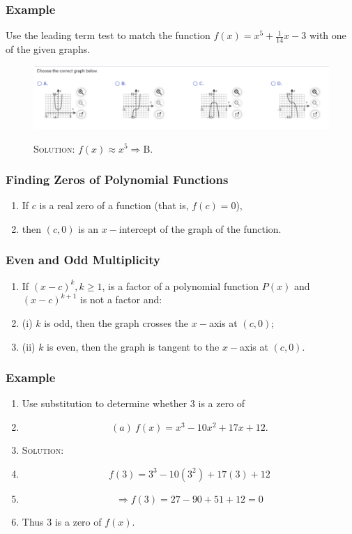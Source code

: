 \documentclass{beamer}
\begin{document}
\begin{frame}
	\frametitle{Example}
	\begin{enumerate}
		\item[]<1-> Use the leading term test to match the function $f(x)=x^{5}+\frac{1}{14}x-3$ with one of the given graphs.
		\item[]<2->
    \begin{figure}
      \begin{center}
        \caption{}
        \includegraphics[scale=0.375]{4_1_7.png}
      \end{center}
      \item[]<3-> \textsc{Solution:} $f(x) \approx x^{5} \Rightarrow $B.
    \end{figure}
	\end{enumerate}
\end{frame}

\begin{frame}
	\frametitle{Finding Zeros of Polynomial Functions}
	\begin{enumerate}
		\item[]<1->If $c$ is a real zero of a function (that is, $f(c)=0$),
		\item[]<2->then $(c,0)$ is an $x-$intercept of the graph of the function.
	\end{enumerate}
\end{frame}

\begin{frame}
	\frametitle{Even and Odd Multiplicity}
	\begin{enumerate}
		\item[]<1->If $(x-c)^{k}, k \geq 1$, is a factor of a polynomial function $P(x)$ and $(x-c)^{k+1}$ is not a factor and:
		\item[]<2-> (i) $k$ is odd, then the graph crosses the $x-$axis at $(c,0)$;
		\item[]<3-> (ii) $k$ is even, then the graph is tangent to the $x-$axis at $(c,0)$.
	\end{enumerate}
\end{frame}

\begin{frame}
  \frametitle{Example}
    \begin{enumerate}
      \item[]<1->Use substitution to determine whether $3$ is a zero of
      \item[]<2-> \[ (a)~f(x)=x^{3}-10x^{2}+17x+12. \]
      \item[]<3-> \textsc{Solution:}
      \item[]<4-> \[ f(3)=3^{3}-10(3^{2})+17(3)+12 \]
      \item[]<5-> \[ \Rightarrow f(3)=27-90+51+12=0 \]
      \item[]<6-> Thus $3$ is a zero of $f(x)$.
    \end{enumerate}
\end{frame}
\end{document}
